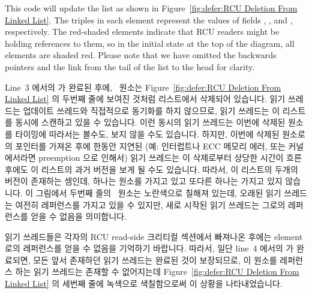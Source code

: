 This code will update the list as shown in
Figure~\ref{fig:defer:RCU Deletion From Linked List}.
The triples in each element represent the values of fields ,
, and , respectively.
The red-shaded elements
indicate that RCU readers might be holding references to them,
so in the initial state at the top of the diagram, all elements
are shaded red.
Please note that
we have omitted the backwards pointers and the link from the tail
of the list to the head for clarity.
\fi

Line~3 에서의  가 완료된 후에, ~원소는
Figure~\ref{fig:defer:RCU Deletion From Linked List} 의 두번째 줄에 보여진
것처럼 리스트에서 삭제되어 있습니다.
읽기 쓰레드는 업데이트 쓰레드와 직접적으로 동기화를 하지 않으므로, 읽기
쓰레드는 이 리스트를 동시에 스캔하고 있을 수 있습니다.
이런 동시의 읽기 쓰레드는 이번에 삭제된 원소를 타이밍에 따라서는 볼수도, 보지
않을 수도 있습니다.
하지만, 이번에 삭제된 원소로의 포인터를 가져온 후에 한동안 지연된 (예:
인터럽트나 ECC 메모리 에러, 또는  커널에서라면 preemption
으로 인해서) 읽기 쓰레드는 이 삭제로부터 상당한 시간이 흐른 후에도 이 리스트의
과거 버전을 보게 될 수도 있습니다.
따라서, 이 리스트의 두개의 버전이 존재하는 셈인데, 하나는  원소를
가지고 있고 또다른 하나는 가지고 있지 않습니다.
이 그림에서 두번째 줄의 ~원소는 노란색으로 칠해져 있는데, 오래된 읽기
쓰레드는 여전히 레퍼런스를 가지고 있을 수 있지만, 새로 시작된 읽기 쓰레드는
그로의 레퍼런스를 얻을 수 없음을 의미합니다.

읽기 쓰레드들은 각자의 RCU read-side 크리티컬 섹션에서 빠져나온 후에는
element~ 로의 레퍼런스를 얻을 수 없음을 기억하기 바랍니다.
따라서, 일단 line~4 에서의  가 완료되면, 모든 앞서
존재하던 읽기 쓰레드는 완료된 것이 보장되므로, 이 원소를 레퍼런스 하는 읽기
쓰레드는 존재할 수 없어지는데
Figure~\ref{fig:defer:RCU Deletion From Linked List} 의 세번째 줄에 녹색으로
색칠함으로써 이 상황을 나타내었습니다.

